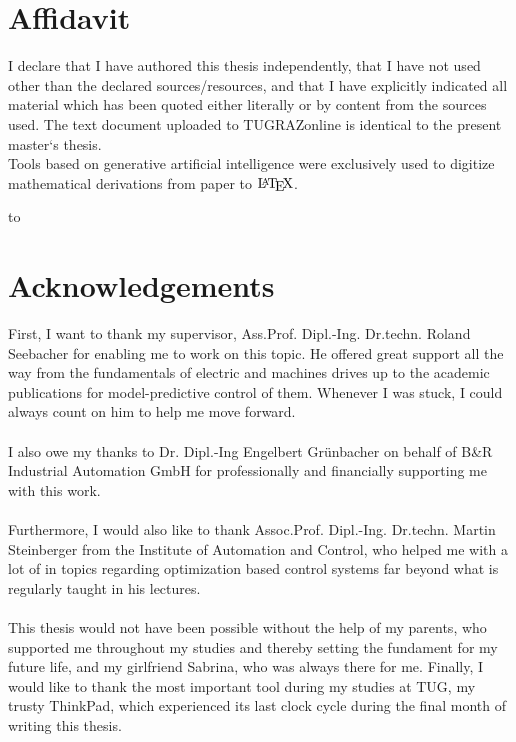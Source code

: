 % 
%
%
%
\newcommand{\textfield}[2]{
  \vbox{
    \hsize=#1\kern3cm\hrule\kern1ex
    \hbox to \hsize{\strut\hfil\footnotesize#2\hfil}%
  }
}


\chapter*{\centering Affidavit}
I declare that I have authored this thesis independently, that I have
not used other than the declared sources/resources, and that I have
explicitly indicated all material which has been quoted either
literally or by content from the sources used. The text document
uploaded to TUGRAZonline is identical to the present master‘s
thesis.\\
Tools based on generative artificial intelligence were exclusively used to digitize mathematical derivations from paper to $\text{\LaTeX}$.

\hbox to \hsize{\textfield{4cm}{Date}\hfil\hfil\textfield{7cm}{Signature}}%

\chapter*{\centering Acknowledgements}
First, I want to thank my supervisor, Ass.Prof. Dipl.-Ing. Dr.techn. Roland Seebacher for enabling me to work on this topic. He offered great support all the way from the fundamentals of electric and machines drives up to the academic publications for model-predictive control of them. Whenever I was stuck, I could always count on him to help me move forward. 
\\\\
I also owe my thanks to Dr. Dipl.-Ing Engelbert Grünbacher on behalf of B\&R Industrial Automation GmbH for professionally and financially supporting me with this work.
\\\\
Furthermore, I would also like to thank Assoc.Prof. Dipl.-Ing. Dr.techn. Martin Steinberger from the Institute of Automation and Control, who helped me with a lot of in topics regarding optimization based control systems far beyond what is regularly taught in his lectures.
\\\\
This thesis would not have been possible without the help of my parents, who supported me throughout my studies and thereby setting the fundament for my future life, and my girlfriend Sabrina, who was always there for me. Finally, I would like to thank the most important tool during my studies at TUG, my trusty ThinkPad, which experienced its last clock cycle during the final month of writing this thesis.
